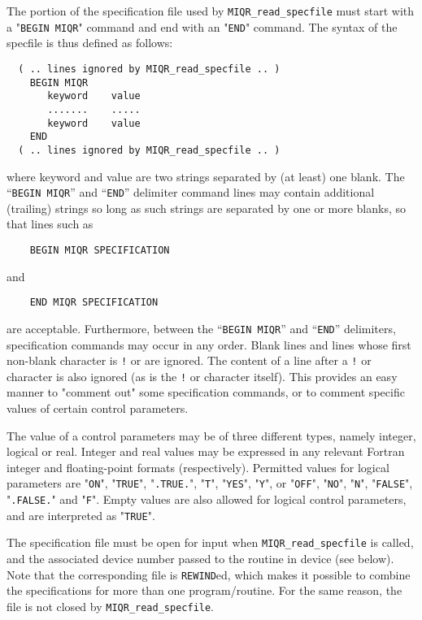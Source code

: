 \documentclass{galahad}
\newcommand{\packagename}{MIQR}
\begin{document}
The portion of the specification file used by 
{\tt \packagename\_read\_specfile}
must start
with a "{\tt BEGIN \packagename}" command and end with an 
"{\tt END}" command.  The syntax of the specfile is thus defined as follows:
\begin{verbatim}
  ( .. lines ignored by MIQR_read_specfile .. )
    BEGIN MIQR
       keyword    value
       .......    .....
       keyword    value
    END 
  ( .. lines ignored by MIQR_read_specfile .. )
\end{verbatim}
where keyword and value are two strings separated by (at least) one blank.
The ``{\tt BEGIN \packagename}'' and ``{\tt END}'' delimiter command lines 
may contain additional (trailing) strings so long as such strings are 
separated by one or more blanks, so that lines such as
\begin{verbatim}
    BEGIN MIQR SPECIFICATION
\end{verbatim}
and
\begin{verbatim}
    END MIQR SPECIFICATION
\end{verbatim}
are acceptable. Furthermore, 
between the
``{\tt BEGIN \packagename}'' and ``{\tt END}'' delimiters,
specification commands may occur in any order.  Blank lines and
lines whose first non-blank character is {\tt !} or {\tt *} are ignored. 
The content 
of a line after a {\tt !} or {\tt *} character is also 
ignored (as is the {\tt !} or {\tt *}
character itself). This provides an easy manner to "comment out" some 
specification commands, or to comment specific values 
of certain control parameters.  

The value of a control parameters may be of three different types, namely
integer, logical or real.
Integer and real values may be expressed in any relevant Fortran integer and
floating-point formats (respectively). Permitted values for logical
parameters are "{\tt ON}", "{\tt TRUE}", "{\tt .TRUE.}", "{\tt T}", 
"{\tt YES}", "{\tt Y}", or "{\tt OFF}", "{\tt NO}",
"{\tt N}", "{\tt FALSE}", "{\tt .FALSE.}" and "{\tt F}". 
Empty values are also allowed for 
logical control parameters, and are interpreted as "{\tt TRUE}".  

The specification file must be open for 
input when {\tt \packagename\_read\_specfile}
is called, and the associated device number 
passed to the routine in device (see below). 
Note that the corresponding 
file is {\tt REWIND}ed, which makes it possible to combine the specifications 
for more than one program/routine.  For the same reason, the file is not
closed by {\tt \packagename\_read\_specfile}.
\end{document}
